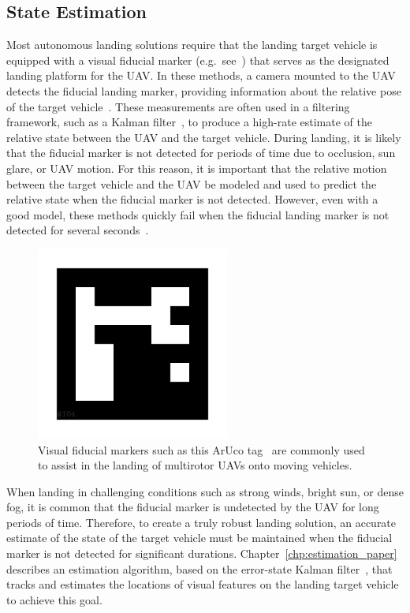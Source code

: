 \subsection{State Estimation}
Most autonomous landing solutions require that the landing target vehicle is equipped
with a visual fiducial marker (e.g.~see~)
that serves as
the designated landing platform for the UAV.
In these methods, a camera mounted to the UAV detects the fiducial landing marker, providing
information about the relative pose of the target
vehicle~\cite{borowczyk2017autonomous}. These measurements are often used in a
filtering framework, such as a Kalman filter~\cite{kalman}, to produce a
high-rate estimate of the relative state between the UAV and the target
vehicle. During landing, it is likely
that the fiducial marker is not detected for periods of time due to occlusion,
sun glare, or UAV motion. For this reason, it is important that the relative
motion between the target vehicle and the UAV be modeled and used to predict
the relative state when the fiducial marker is not detected.
However, even with a good model,
these methods quickly fail when the fiducial landing
marker is not detected for several seconds~\cite{ling2014precision}.

\begin{figure}[h]
  \centering
  \includegraphics[width=2.5in]{figures/aruco_104.png}
  \caption[Visual Fiducial Marker]{Visual fiducial markers such as this
    ArUco tag~\cite{garrido2016generation} are commonly used to assist in the
  landing of multirotor UAVs onto moving vehicles.}
  \label{fig:aruco_tag}
\end{figure}

When landing in challenging conditions such as strong winds, bright sun, or
dense fog, it is common that the fiducial marker is undetected by the UAV
for long periods of time.
Therefore, to create a truly robust landing solution, an accurate estimate of
the state of the target vehicle must be maintained when the fiducial marker is
not detected for significant durations.
Chapter~\ref{chp:estimation_paper}
describes an estimation algorithm, based on the error-state Kalman
filter~\cite{roumeliotis1999circumventing}, that tracks and estimates the locations of
visual features on the landing target vehicle to achieve this goal.

